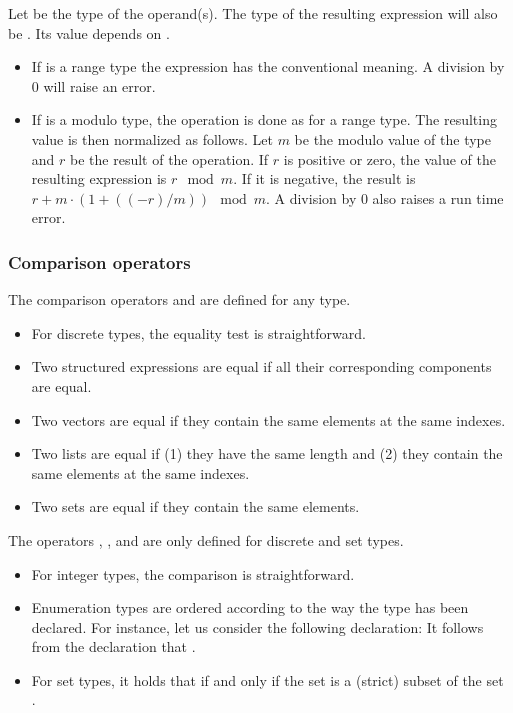 Let  be the type of the operand(s).  The type of the
resulting expression will also be .  Its value depends on
.
\begin{itemize}
\item
  If  is a range type the expression has the conventional
  meaning.  A division by 0 will raise an error.
\item
  If  is a modulo type, the operation is done as for a
  range type.  The resulting value is then normalized as follows.  Let
  $m$ be the modulo value of the type and $r$ be the result of the
  operation.  If $r$ is positive or zero, the value of the resulting
  expression is $r \mod m$.  If it is negative, the result is $r + m
  \cdot (1 + ((-r) / m)) \mod m$.  A division by $0$ also raises a run
  time error.
\end{itemize}

\integeroperationdef


\subsubsection{Comparison operators}
The comparison operators \LS{=} and \LS{!=} are defined for any type.
\begin{itemize}
\item
  For discrete types, the equality test is straightforward.
\item
  Two structured expressions are equal if all their corresponding
  components are equal.
\item
  Two vectors are equal if they contain the same elements at the same
  indexes.
\item
  Two lists are equal if (1) they have the same length and (2) they
  contain the same elements at the same indexes.
\item
  Two sets are equal if they contain the same elements.
\end{itemize}
\noindent
The operators \LS{>}, \LS{>=}, \LS{<} and \LS{<=} are only defined for
discrete and set types.
\begin{itemize}
\item 
  For integer types, the comparison is straightforward.
\item
  Enumeration types are ordered according to the way the type has been
  declared.  For instance, let us consider the following declaration:
   It follows from the
  declaration that .
\item
  For set types, it holds that  if and only if the set
   is a (strict) subset of the set .
\end{itemize}

